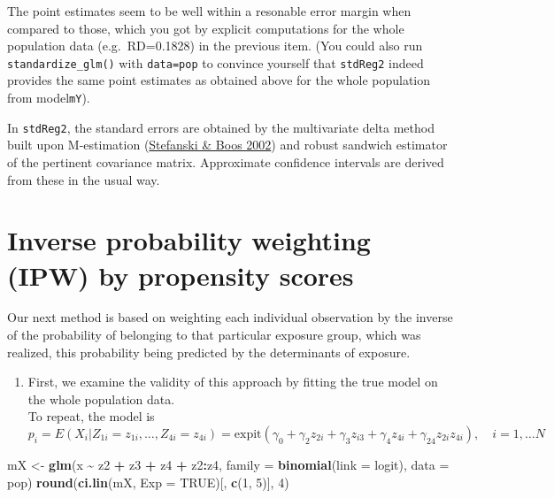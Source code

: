 \documentclass[
]{book}
\newenvironment{Shaded}{\begin{snugshade}}{\end{snugshade}}
\newcommand{\AttributeTok}[1]{\textcolor[rgb]{0.13,0.29,0.53}{#1}}
\newcommand{\ConstantTok}[1]{\textcolor[rgb]{0.56,0.35,0.01}{#1}}
\newcommand{\DecValTok}[1]{\textcolor[rgb]{0.00,0.00,0.81}{#1}}
\newcommand{\FunctionTok}[1]{\textcolor[rgb]{0.13,0.29,0.53}{\textbf{#1}}}
\newcommand{\NormalTok}[1]{#1}
\newcommand{\OtherTok}[1]{\textcolor[rgb]{0.56,0.35,0.01}{#1}}
\newcommand{\SpecialCharTok}[1]{\textcolor[rgb]{0.81,0.36,0.00}{\textbf{#1}}}
\providecommand{\tightlist}{%
  \setlength{\itemsep}{0pt}\setlength{\parskip}{0pt}}
\begin{document}
The point estimates seem to be well within a resonable error margin when
compared to those, which you got by explicit computations for the whole
population data (e.g.~RD=0.1828) in the previous item. (You could also
run \texttt{standardize\_glm()} with \texttt{data=pop} to convince yourself that
\texttt{stdReg2} indeed provides the same point estimates as obtained above
for the whole population from model\texttt{mY}).

In \texttt{stdReg2}, the standard errors are obtained by the multivariate delta
method built upon M-estimation (\href{https://doi.org/10.1198/000313002753631330}{Stefanski \& Boos
2002}) and robust sandwich
estimator of the pertinent covariance matrix. Approximate confidence
intervals are derived from these in the usual way.

\section{Inverse probability weighting (IPW) by propensity scores}\label{inverse-probability-weighting-ipw-by-propensity-scores}

Our next method is based on weighting each individual observation by the
inverse of the probability of belonging to that particular exposure
group, which was realized, this probability being predicted by the
determinants of exposure.

\begin{enumerate}
\def\labelenumi{\arabic{enumi}.}
\tightlist
\item
  First, we examine the validity of this approach by fitting the true
  model on the whole population data.\\
  To repeat, the model is \[ 
   p_i = E(X_i| Z_{1i} = z_{1i}, \dots, Z_{4i} = z_{4i})
   = \text{expit}(\gamma_0 + \gamma_2 z_{2i} +
    \gamma_3 z_{i3} + \gamma_4 z_{4i} + \gamma_{24} z_{2i}z_{4i}), \quad i=1, \dots N 
   \]
\end{enumerate}

\begin{Shaded}
\begin{Highlighting}[]
\NormalTok{mX }\OtherTok{\textless{}{-}} \FunctionTok{glm}\NormalTok{(x }\SpecialCharTok{\textasciitilde{}}\NormalTok{ z2 }\SpecialCharTok{+}\NormalTok{ z3 }\SpecialCharTok{+}\NormalTok{ z4 }\SpecialCharTok{+}\NormalTok{ z2}\SpecialCharTok{:}\NormalTok{z4,}
  \AttributeTok{family =} \FunctionTok{binomial}\NormalTok{(}\AttributeTok{link =}\NormalTok{ logit), }\AttributeTok{data =}\NormalTok{ pop)}
\FunctionTok{round}\NormalTok{(}\FunctionTok{ci.lin}\NormalTok{(mX, }\AttributeTok{Exp =} \ConstantTok{TRUE}\NormalTok{)[, }\FunctionTok{c}\NormalTok{(}\DecValTok{1}\NormalTok{, }\DecValTok{5}\NormalTok{)], }\DecValTok{4}\NormalTok{)}
\end{Highlighting}
\end{Shaded}
\end{document}
